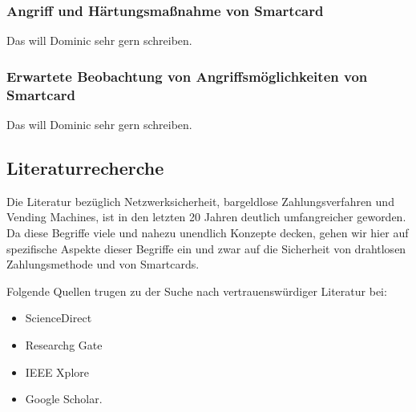 \subsubsection{Angriff und Härtungsmaßnahme von Smartcard}
Das will Dominic sehr gern schreiben.

\subsubsection{Erwartete Beobachtung von Angriffsmöglichkeiten von Smartcard}
Das will Dominic sehr gern schreiben.


\subsection{Literaturrecherche}

Die Literatur bezüglich Netzwerksicherheit, bargeldlose Zahlungsverfahren und Vending Machines, ist in den letzten 20 
Jahren deutlich umfangreicher geworden. Da diese Begriffe viele und nahezu unendlich Konzepte decken, gehen wir hier
auf spezifische Aspekte dieser Begriffe ein und zwar auf die Sicherheit von drahtlosen Zahlungsmethode und von 
Smartcards. 

Folgende Quellen trugen zu der Suche nach vertrauenswürdiger Literatur bei:

\begin{itemize}
    \item ScienceDirect
    \item Researchg Gate
    \item IEEE Xplore
    \item Google Scholar.
\end{itemize}

